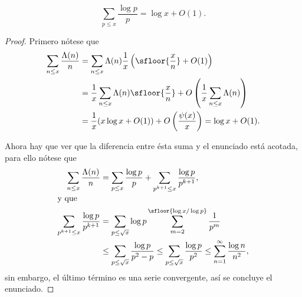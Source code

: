 \documentclass[teoria-numeros.tex]{subfiles}
\begin{document}
\begin{thmi}
	$$ \sum_{p \le x} \frac{\log p}{p} = \log x + O(1). $$
\end{thmi}
\begin{proof}
	Primero nótese que
	\begin{align}
		\sum_{n \le x} \frac{\Lambda(n)}{n} &= \sum_{n\le x} \Lambda(n) \frac{1}{x}\left( \sfloor{ \frac{x}{n} } + O(1) \right) \notag \\
		&= \frac{1}{x} \sum_{n \le x} \Lambda(n)\sfloor{ \frac{x}{n} } + O\left( \frac{1}{x}\sum_{n\le x} \Lambda(n) \right) \notag \\
		&= \frac{1}{x} ( x\log x + O(1) ) + O\left( \frac{\psi(x)}{x} \right) = \log x + O(1). \label{eq:mertens_i_var}
	\end{align}

	Ahora hay que ver que la diferencia entre ésta suma y el enunciado está acotada, para ello nótese que
	\begin{align*}
		\sum_{n\le x} \frac{\Lambda(n)}{n}          &= \sum_{p\le x} \frac{\log p}{p} + \sum_{p^{k+1} \le x} \frac{\log p}{p^{k+1}}, \\
		\intertext{y que}
		\sum_{p^{k+1} \le x} \frac{\log p}{p^{k+1}} &= \sum_{p\le\sqrt{x}} \log p \sum_{m=2}^{ \sfloor{\log x/\log p} } \frac{1}{p^m} \\
		                                            &\le \sum_{p\le\sqrt{x}} \frac{\log p}{p^2 - p} \le \sum_{p\le\sqrt{x}} \frac{\log p}{p^2} \le \sum_{n=1}^\infty \frac{\log n}{n^2},
	\end{align*}
	sin embargo, el último término es una serie convergente, así se concluye el enunciado.
\end{proof}
\end{document}
